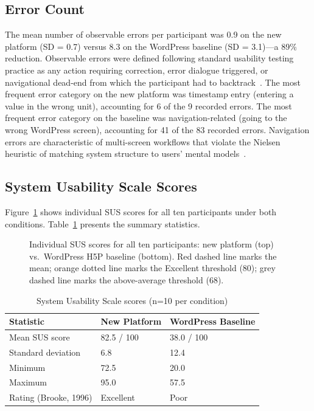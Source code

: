 \subsection{Error Count}

The mean number of observable errors per participant was 0.9 on the new
platform (SD = 0.7) versus 8.3 on the WordPress baseline (SD = 3.1)---a
89\% reduction. Observable errors were defined following standard usability
testing practice as any action requiring correction, error dialogue triggered,
or navigational dead-end from which the participant had to backtrack~\cite{nielsen1994}.
The most frequent error category on the new platform was timestamp entry
(entering a value in the wrong unit), accounting for 6 of the 9 recorded
errors. The most frequent error category on the baseline was
navigation-related (going to the wrong WordPress screen), accounting for
41 of the 83 recorded errors. Navigation errors are characteristic of
multi-screen workflows that violate the Nielsen heuristic of matching system
structure to users' mental models~\cite{nielsen1994,norman1988}.

\subsection{System Usability Scale Scores}

Figure~\ref{fig:sus_dist} shows individual SUS scores for all ten participants
under both conditions. Table~\ref{tab:sus} presents the summary statistics.

\begin{figure}[H]
  \centering
  
  \caption{Individual SUS scores for all ten participants: new platform
           (top) vs.\ WordPress H5P baseline (bottom). Red dashed line
           marks the mean; orange dotted line marks the Excellent threshold
           (80); grey dashed line marks the above-average threshold (68).}
  \label{fig:sus_dist}
\end{figure}

\begin{table}[H]
  \centering
  \caption{System Usability Scale scores (n=10 per condition)}
  \label{tab:sus}
  \begin{tabularx}{\linewidth}{Xll}
    \toprule
    \textbf{Statistic}      & \textbf{New Platform} & \textbf{WordPress Baseline} \\
    \midrule
    Mean SUS score          & 82.5 / 100            & 38.0 / 100 \\
    Standard deviation      & 6.8                   & 12.4 \\
    Minimum                 & 72.5                  & 20.0 \\
    Maximum                 & 95.0                  & 57.5 \\
    Rating (Brooke, 1996)   & Excellent             & Poor \\
    \bottomrule
  \end{tabularx}
\end{table}

